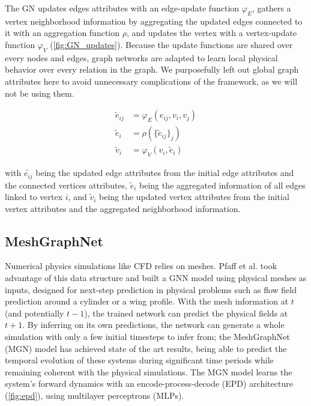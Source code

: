 The GN updates edges attributes with an edge-update function $\varphi_E$, gathers a vertex neighborhood information by aggregating the updated edges connected to it with an aggregation function $\rho$, and updates the vertex with a vertex-update function $\varphi_V$ (\autoref{fig:GN_updates}). Because the update functions are shared over every nodes and edges, graph networks are adapted to learn local physical behavior over every relation in the graph. We purposefully left out global graph attributes here to avoid unnecessary complications of the framework, as we will not be using them.

\begin{align} \label{eq:GN}
    \tilde{e}_{ij} &= \varphi_E(e_{ij}, v_i, v_j) \nonumber\\
    \tilde{e}_i &= \rho(\{ \tilde{e}_{ij} \}_j) \\
    \tilde{v}_i &= \varphi_V(v_i, \tilde{e}_i) \nonumber
\end{align}

with $\tilde{e_{ij}}$ being the updated edge attributes from the initial edge attributes and the connected vertices attributes, $\tilde{e}_i$ being the aggregated information of all edges linked to vertex $i$, and $\tilde{v}_i$ being the updated vertex attributes from the initial vertex attributes and the aggregated neighborhood information.


\subsection{MeshGraphNet}
\label{ch3:sec:meshgraphnet}

Numerical physics simulations like CFD relies on meshes. Pfaff et al. \cite{pfaff_learning_2021} took advantage of this data structure and built a GNN model using physical meshes as inputs, designed for next-step prediction in physical problems such as flow field prediction around a cylinder or a wing profile. With the mesh information at $t$ (and potentially $t-1$), the trained network can predict the physical fields at $t+1$. By inferring on its own predictions, the network can generate a whole simulation with only a few initial timesteps to infer from; the MeshGraphNet (MGN) model has achieved state of the art results, being able to predict the temporal evolution of these systems during significant time periods while remaining coherent with the physical simulations. The MGN model learns the system's forward dynamics with an encode-process-decode (EPD) architecture (\autoref{fig:epd}), using multilayer perceptrons (MLPs).

